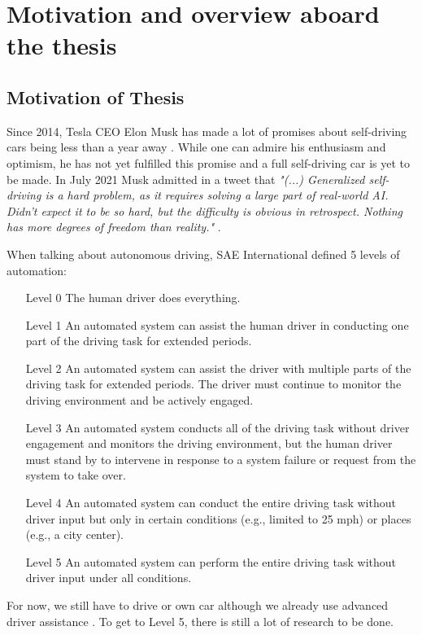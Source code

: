 \chapter{Motivation and overview aboard the thesis}
\label{chap:outline}

\section{Motivation of Thesis}
Since 2014, Tesla CEO Elon Musk has made a lot of promises about self-driving cars being less than a year away \cite{tangermann-2022}. While one can admire his enthusiasm and optimism, he has not yet fulfilled this promise and a full self-driving car is yet to be made. In July 2021 Musk admitted in a tweet that \textit{"(...) Generalized self-driving is a hard problem, as it requires solving a large part of real-world AI. Didn’t expect it to be so hard, but the difficulty is obvious in retrospect.  Nothing has more degrees of freedom than reality."} \cite{musk-2021}. \bigskip

When talking about autonomous driving, SAE International defined 5 levels of automation:
\begin{enumerate}
    \item [Level 0] The human driver does everything.
    \item [Level 1] An automated system can assist the human driver in conducting one part of the driving task for extended periods.
    \item [Level 2] An automated system can assist the driver with multiple parts of the driving task for extended periods. The driver must continue to monitor the driving environment and be actively engaged.
    \item [Level 3] An automated system conducts all of the driving task without driver engagement and monitors the driving environment, but the human driver must stand by to intervene in response to a system failure or request from the system to take over.
    \item [Level 4] An automated system can conduct the entire driving task without driver input but only in certain conditions (e.g., limited to 25 mph) or places (e.g., a city center).
    \item [Level 5] An automated system can perform the entire driving task without driver input under all conditions.
\end{enumerate}
For now, we still have to drive or own car although we already use advanced driver assistance \cite{insurance-institute-for-highway-safety-2022}. To get to Level 5, there is still a lot of research to be done.\bigskip

